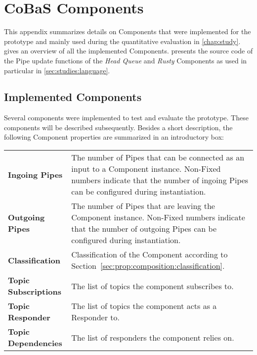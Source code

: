 \chapter{CoBaS Components}%
\label{appendix:cobas}

This appendix summarizes details on \cobas{} Components that were implemented for the prototype and mainly used during the quantitative evaluation in \cref{chap:study}.  gives an overview of all the implemented Components.  presents the source code of the Pipe update functions of the \emph{Head Queue} and \emph{Rusty} Components as used in particular in \cref{sec:studies:language}.

\section{Implemented Components}%
\label{appendix:components}

Several components were implemented to test and evaluate the \cobas{} prototype. These components will be described subsequently. Besides a short description, the following Component properties are summarized in an introductory box:

\begin{tabularx}{\columnwidth}{lX}
	\textbf{Ingoing Pipes}       & The number of Pipes that can be connected as an input to a Component instance. Non-Fixed numbers indicate that the number of ingoing Pipes can be configured during instantiation. \\
	\textbf{Outgoing Pipes}      & The number of Pipes that are leaving the Component instance. Non-Fixed numbers indicate that the number of outgoing Pipes can be configured during instantiation.                  \\
	\textbf{Classification}      & Classification of the Component according to Section~\ref{sec:prop:composition:classification}.                                                                                    \\
	\textbf{Topic Subscriptions} & The list of topics the component subscribes to.                                                                                                                                    \\
	\textbf{Topic Responder}     & The list of topics the component acts as a Responder to.                                                                                                                           \\
	\textbf{Topic Dependencies}  & The list of responders the component relies on.
\end{tabularx}

